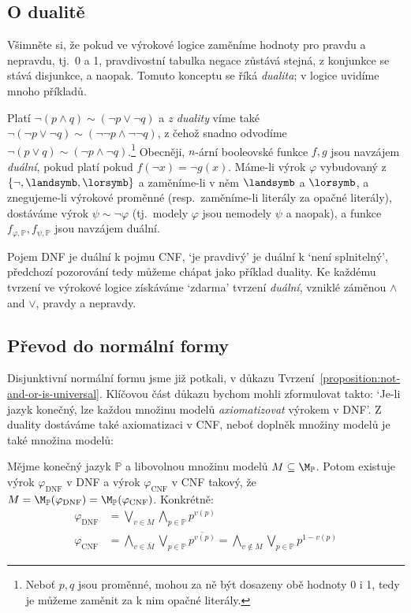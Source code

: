 \subsection{O dualitě}

Všimněte si, že pokud ve výrokové logice zaměníme hodnoty pro pravdu a nepravdu, tj.\ 0 a 1, pravdivostní tabulka negace zůstává stejná, z konjunkce se stává disjunkce, a naopak. Tomuto konceptu se říká \emph{dualita}; v logice uvidíme mnoho příkladů. 

Platí $\neg(p\land q)\sim (\neg p\lor \neg q)$ a \emph{z duality} víme také $\neg(\neg p\lor \neg q)\sim (\neg \neg p\land \neg \neg q)$, z čehož snadno odvodíme $\neg(p\lor q)\sim (\neg p\land \neg q)$.\footnote{Neboť $p,q$ jsou proměnné, mohou za ně být dosazeny obě hodnoty 0 i 1, tedy je můžeme zaměnit za k nim opačné literály.} Obecněji, $n$-ární booleovské funkce $f,g$ jsou navzájem \emph{duální}, pokud platí pokud $f(\neg x)=\neg g(x)$. Máme-li výrok $\varphi$ vybudovaný z $\{\neg,\landsymb,\lorsymb\}$ a zaměníme-li v něm $\landsymb$ a $\lorsymb$, a znegujeme-li výrokové proměnné (resp.\ zaměníme-li literály za opačné literály), dostáváme výrok $\psi\sim\neg\varphi$ (tj.\ modely $\varphi$ jsou nemodely $\psi$ a naopak), a funkce $f_{\varphi,\mathbb P},f_{\psi,\mathbb P}$ jsou navzájem duální.

Pojem DNF je duální k pojmu CNF, `je pravdivý' je duální k `není splnitelný', předchozí pozorování tedy můžeme chápat jako příklad duality. Ke každému tvrzení ve výrokové logice získáváme `zdarma' tvrzení \emph{duální}, vzniklé záměnou $\land$ and $\lor$, pravdy a nepravdy.


\subsection{Převod do normální formy}

Disjunktivní normální formu jsme již potkali, v důkazu Tvrzení~\ref{proposition:not-and-or-is-universal}. Klíčovou část důkazu bychom mohli zformulovat takto: `Je-li jazyk konečný, lze každou množinu modelů \emph{axiomatizovat} výrokem v DNF'. Z duality dostáváme také axiomatizaci v CNF, neboť doplněk množiny modelů je také množina modelů:

\begin{proposition} \label{proposition:axiomatize-in-DNF-CNF}
    Mějme konečný jazyk $\mathbb P$ a libovolnou množinu modelů $M\subseteq\M_\mathbb P$. Potom existuje výrok $\varphi_{\mathrm{DNF}}$ v DNF a výrok $\varphi_{\mathrm{CNF}}$ v CNF takový, že $M=\M_\mathbb P(\varphi_{\mathrm{DNF}})=\M_\mathbb P(\varphi_{\mathrm{CNF}})$. Konkrétně:
\begin{align*}
    \varphi_{\mathrm{\mathrm{DNF}}} &= \bigvee_{v\in M}\bigwedge_{p\in\mathbb P}p^{v(p)}\\
    \varphi_{\mathrm{CNF}} &= \bigwedge_{v\in \overline{M}}\bigvee_{p\in\mathbb P}\overline{p^{v(p)}}=\bigwedge_{v\notin M}\bigvee_{p\in\mathbb P}p^{1-v(p)}
\end{align*}
\end{proposition}



